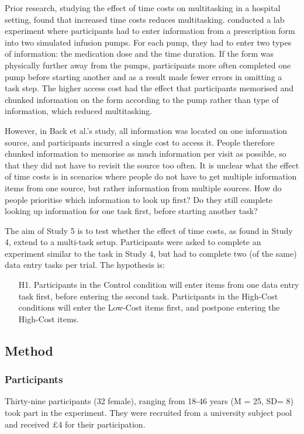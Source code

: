 Prior research, studying the effect of time costs on multitasking in a hospital setting, found that increased time costs reduces multitasking. \citet{Back2012} conducted a lab experiment where participants had to enter information from a prescription form into two simulated infusion pumps. For each pump, they had to enter two types of information: the medication dose and the time duration. If the form was physically further away from the pumps, participants more often completed one pump before starting another and as a result made fewer errors in omitting a task step. The higher access cost had the effect that participants memorised and chunked information on the form according to the pump rather than type of information, which reduced multitasking.

However, in Back et al.'s study, all information was located on one information source, and participants incurred a single cost to access it. People therefore chunked information to memorise as much information per visit as possible, so that they did not have to revisit the source too often. It is unclear what the effect of time costs is in scenarios where people do not have to get multiple information items from one source, but rather information from multiple sources. How do people prioritise which information to look up first? Do they still complete looking up information for one task first, before starting another task?

The aim of Study 5 is to test whether the effect of time costs, as found in Study 4, extend to a multi-task setup. Participants were asked to complete an experiment similar to the task in Study 4, but had to complete two (of the same) data entry tasks per trial. The hypothesis is:

\begin{itemize}
\item [H1.]
Participants in the Control condition will enter items from one data entry task first, before entering the second task. Participants in the High-Cost conditions will enter the Low-Cost items first, and postpone entering the High-Cost items.
\end{itemize}

\subsection{Method}
\subsubsection{Participants}
Thirty-nine participants (32 female), ranging from 18-46 years (M = 25, SD= 8) took part in the experiment. They were recruited from a university subject pool and received $\pounds$4 for their participation.

